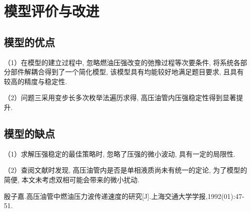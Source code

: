 \documentclass{cumcmthesis}
\begin{document}
\section{模型评价与改进}

\subsection{模型的优点}
（1）在模型的建立过程中, 忽略燃油压强改变的弛豫过程等次要条件, 将系统各部分部件解耦合得到了一个简化模型, 该模型具有均能较好地满足题目要求, 且具有较高的精度与稳定性. 

（2）问题三采用变步长多次枚举法遍历求得, 高压油管内压强稳定性得到显著提升. 

\subsection{模型的缺点}
（1）求解压强稳定的最佳策略时, 忽略了压强的微小波动, 具有一定的局限性. 

（2）查阅文献时发现, 高压油管内是否是单相液质尚未有统一的定论, 为了模型的简便, 本文未考虑双相可能会带来的微小扰动. 


\begin{thebibliography}{9}%
  殷子嘉.高压油管中燃油压力波传递速度的研究[J].上海交通大学学报,1992(01):47-51.
\end{thebibliography}
\end{document}
